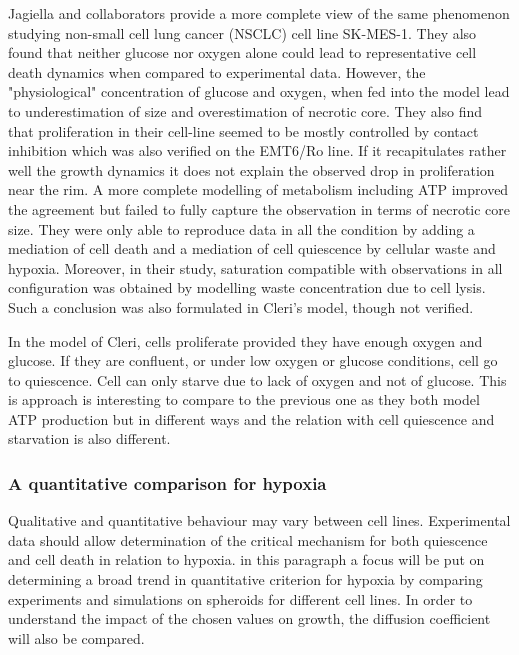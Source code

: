 \documentclass[11pt,a4paper]{article}
\begin{document}
Jagiella and collaborators provide a more complete view of the same phenomenon studying non-small cell lung cancer (NSCLC) cell line SK-MES-1.\cite{Jagiella2016} They also found that neither glucose nor oxygen alone could lead to representative cell death dynamics when compared to experimental data. However, the "physiological" concentration of glucose and oxygen, when fed into the model lead to underestimation of size and overestimation of necrotic core. They also find that proliferation in their cell-line seemed to be mostly controlled by contact inhibition which was also verified on the EMT6/Ro line. If it recapitulates rather well the growth dynamics it does not explain the observed drop in proliferation near the rim. A more complete modelling of metabolism including ATP improved the agreement but failed to fully capture the observation in terms of necrotic core size. They were only able to reproduce data in all the condition by adding a mediation of cell death and a mediation of cell quiescence by cellular waste and hypoxia. Moreover, in their study, saturation compatible with observations in all configuration was obtained by modelling waste concentration due to cell lysis. Such a conclusion was also formulated in Cleri's model, though not verified.\cite{Cleri2019}

In the model of Cleri, cells proliferate provided they have enough oxygen and glucose. If they are confluent, or under low oxygen or glucose conditions, cell go to quiescence. Cell can only starve due to lack of oxygen and not of glucose. This is approach is interesting to compare to the previous one as they both model ATP production but in different ways and the relation with cell quiescence and starvation is also different.

\subsubsection{A quantitative comparison for hypoxia}
Qualitative and quantitative behaviour may vary between cell lines. Experimental data should allow determination of the critical mechanism for both quiescence and cell death in relation to hypoxia. in this paragraph a focus will be put on determining a broad trend in quantitative criterion for hypoxia by comparing experiments and simulations on spheroids for different cell lines. In order to understand the impact of the chosen values on growth, the diffusion coefficient will also be compared.
\end{document}
